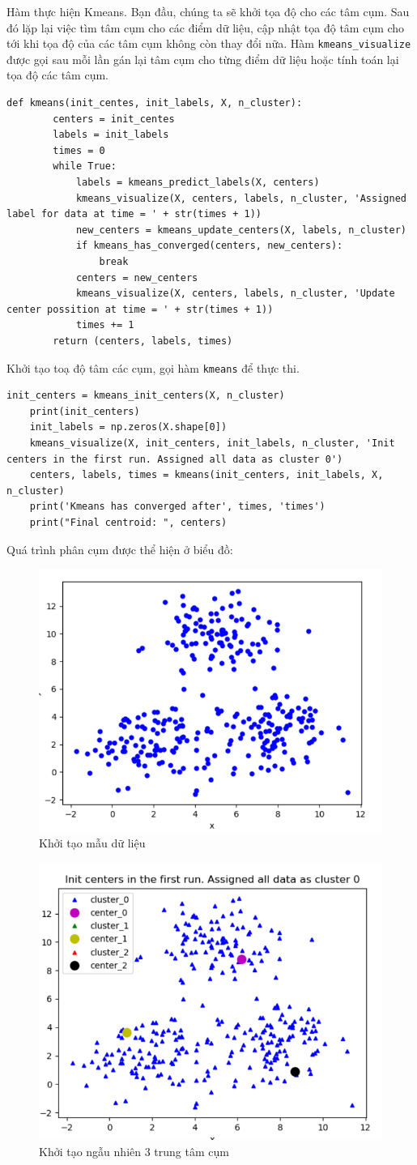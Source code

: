 \documentclass{article}
\begin{document}
	\newpage
	Hàm thực hiện Kmeans. Bạn đầu, chúng ta sẽ khởi tọa độ cho các tâm cụm. Sau đó lặp lại việc tìm tâm cụm cho các điểm dữ liệu, cập nhật tọa độ tâm cụm cho tới khi tọa độ của các tâm cụm không còn thay đổi nữa. Hàm \texttt{kmeans\_visualize} được gọi sau mỗi lần gán lại tâm cụm cho từng điểm dữ liệu hoặc tính toán lại tọa độ các tâm cụm.
	\begin{lstlisting}[style=myPythonStyle]
	def kmeans(init_centes, init_labels, X, n_cluster):
		centers = init_centes
		labels = init_labels
		times = 0
		while True:
			labels = kmeans_predict_labels(X, centers)
			kmeans_visualize(X, centers, labels, n_cluster, 'Assigned label for data at time = ' + str(times + 1))
			new_centers = kmeans_update_centers(X, labels, n_cluster)
			if kmeans_has_converged(centers, new_centers):
				break
			centers = new_centers
			kmeans_visualize(X, centers, labels, n_cluster, 'Update center possition at time = ' + str(times + 1))
			times += 1
		return (centers, labels, times)
	\end{lstlisting}
	Khởi tạo toạ độ tâm các cụm, gọi hàm \texttt{kmeans} để thực thi.
	\begin{lstlisting}[style=myPythonStyle]
	init_centers = kmeans_init_centers(X, n_cluster)
	print(init_centers)
	init_labels = np.zeros(X.shape[0])
	kmeans_visualize(X, init_centers, init_labels, n_cluster, 'Init centers in the first run. Assigned all data as cluster 0')
	centers, labels, times = kmeans(init_centers, init_labels, X, n_cluster)
	print('Kmeans has converged after', times, 'times')
	print("Final centroid: ", centers)
	\end{lstlisting}
	\newpage
	Quá trình phân cụm được thể hiện ở biểu đồ:
	\begin{figure}[h]
		\centering
		\includegraphics[width=0.6\linewidth]{img/py_ex_1}
		\caption{Khởi tạo mẫu dữ liệu}
	\end{figure}
	\begin{figure}[h]
		\centering
		\includegraphics[width=0.6\linewidth]{img/py_ex_2}
		\caption{Khởi tạo ngẫu nhiên 3 trung tâm cụm}
	\end{figure}
\end{document}
